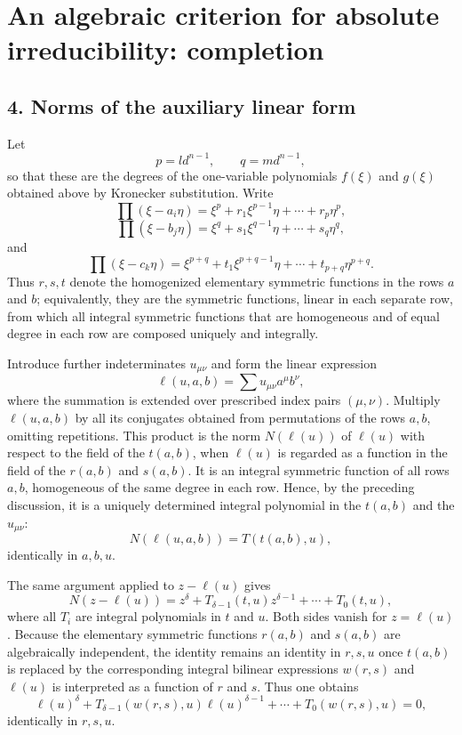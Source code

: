 \documentclass[11pt]{article}
\begin{document}
\clearpage
\section{An algebraic criterion for absolute irreducibility: completion}

\subsection*{4. Norms of the auxiliary linear form}

Let
\[
  p = l d^{n-1}, \qquad q = m d^{n-1},
\]
so that these are the degrees of the one-variable polynomials $f(\xi)$ and $g(\xi)$ obtained above by Kronecker substitution. Write
\[
  \prod (\xi-a_i\eta)=\xi^p+r_1\xi^{p-1}\eta+\cdots+r_p\eta^p,
\]
\[
  \prod (\xi-b_j\eta)=\xi^q+s_1\xi^{q-1}\eta+\cdots+s_q\eta^q,
\]
and
\[
  \prod (\xi-c_k\eta)=\xi^{p+q}+t_1\xi^{p+q-1}\eta+\cdots+t_{p+q}\eta^{p+q}.
\]
Thus $r,s,t$ denote the homogenized elementary symmetric functions in the rows $a$ and $b$; equivalently, they are the symmetric functions, linear in each separate row, from which all integral symmetric functions that are homogeneous and of equal degree in each row are composed uniquely and integrally.

Introduce further indeterminates $u_{\mu\nu}$ and form the linear expression
\begin{equation}
  \ell(u,a,b)=\sum u_{\mu\nu} a^\mu b^\nu,                         \tag{9}
\end{equation}
where the summation is extended over prescribed index pairs $(\mu,\nu)$. Multiply $\ell(u,a,b)$ by all its conjugates obtained from permutations of the rows $a,b$, omitting repetitions. This product is the norm $N(\ell(u))$ of $\ell(u)$ with respect to the field of the $t(a,b)$, when $\ell(u)$ is regarded as a function in the field of the $r(a,b)$ and $s(a,b)$. It is an integral symmetric function of all rows $a,b$, homogeneous of the same degree in each row. Hence, by the preceding discussion, it is a uniquely determined integral polynomial in the $t(a,b)$ and the $u_{\mu\nu}$:
\begin{equation}
  N(\ell(u,a,b)) = T(t(a,b),u),                                      \tag{10}
\end{equation}
identically in $a,b,u$.

The same argument applied to $z-\ell(u)$ gives
\[
 N(z-\ell(u))=z^\delta+T_{\delta-1}(t,u)z^{\delta-1}+\cdots+T_0(t,u),
\]
where all $T_i$ are integral polynomials in $t$ and $u$. Both sides vanish for $z=\ell(u)$. Because the elementary symmetric functions $r(a,b)$ and $s(a,b)$ are algebraically independent, the identity remains an identity in $r,s,u$ once $t(a,b)$ is replaced by the corresponding integral bilinear expressions $w(r,s)$ and $\ell(u)$ is interpreted as a function of $r$ and $s$. Thus one obtains
\begin{equation}
  \ell(u)^\delta+T_{\delta-1}(w(r,s),u)\ell(u)^{\delta-1}+\cdots+T_0(w(r,s),u)=0,        \tag{11}
\end{equation}
identically in $r,s,u$.
\end{document}
